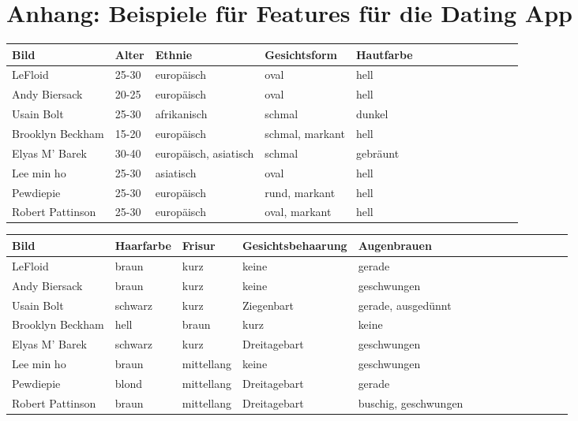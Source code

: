 \documentclass{newlayout}
\begin{document}
\section*{Anhang: Beispiele für Features für die Dating App}
\small
\begin{tabular}{ | l | l | l | l | l | l | l | l | l | l | l | l | l | l | }
\hline
	Bild & Alter & Ethnie & Gesichtsform & Hautfarbe \\ \hline
	LeFloid & 25-30 & europäisch & oval & hell  \\ \hline
	Andy Biersack & 20-25 & europäisch & oval & hell  \\ \hline
	Usain Bolt & 25-30 & afrikanisch & schmal & dunkel   \\ \hline
	Brooklyn Beckham & 15-20 & europäisch & schmal, markant & hell  \\ \hline
	Elyas M' Barek & 30-40 & europäisch, asiatisch & schmal & gebräunt   \\ \hline
	Lee min ho & 25-30 & asiatisch & oval & hell \\ \hline
	Pewdiepie & 25-30 & europäisch & rund, markant & hell   \\ \hline
	Robert Pattinson & 25-30 & europäisch & oval, markant & hell  \\ \hline
\end{tabular}
\medskip
\vspace{1em}
\medskip
\begin{tabular}{ | l | l | l | l | l | l | l | l | l | l | l | l | l | l | }
\hline
	Bild & Haarfarbe & Frisur & Gesichtsbehaarung & Augenbrauen \\ \hline
	LeFloid & braun & kurz & keine & gerade \\ \hline
	Andy Biersack & braun & kurz & keine & geschwungen  \\ \hline
	Usain Bolt & schwarz & kurz & Ziegenbart & gerade, ausgedünnt  \\ \hline
	Brooklyn Beckham & hell & braun & kurz & keine \\ \hline
	Elyas M' Barek & schwarz & kurz & Dreitagebart & geschwungen  \\ \hline
	Lee min ho & braun & mittellang & keine & geschwungen  \\ \hline
	Pewdiepie & blond & mittellang & Dreitagebart & gerade  \\ \hline
	Robert Pattinson & braun & mittellang & Dreitagebart & buschig, geschwungen  \\ \hline
\end{tabular}
\medskip
\vspace{1em}
\end{document}
